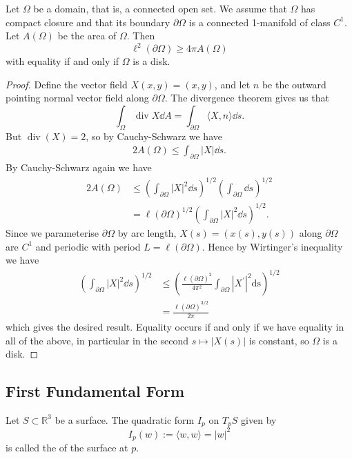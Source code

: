 \documentclass[10pt]{article}
\begin{document}
\begin{theorem}
    Let $\Omega$ be a domain, that is, a connected open set. We assume that $\Omega$ has compact closure and that its boundary $\partial \Omega$ is a connected 1-manifold of class $C^1$. Let $A(\Omega)$ be the area of $\Omega$. Then
$$
    \ell^2(\partial \Omega) \geq 4 \pi A(\Omega)
$$
with equality if and only if $\Omega$ is a disk.
\end{theorem}
\begin{proof}
    Define the vector field $X(x, y) = (x, y)$, and let $n$ be the outward pointing normal vector field along $\partial \Omega$. The divergence theorem gives us that
    $$
    \int_{\Omega} \operatorname{div} X \dd A = \int_{\partial \Omega} \langle X, n \rangle \dd s.
    $$
    But $\operatorname{div}(X) = 2$, so by Cauchy-Schwarz we have
    \begin{align*}
        2A(\Omega) \leq \int_{\partial \Omega} |X| \dd s.
    \end{align*}
    By Cauchy-Schwarz again we have
    \begin{align*}
        2A(\Omega) &\leq \left(\int_{\partial \Omega} |X|^2 \dd s \right)^{1/2}
        \left(\int_{\partial \Omega} \dd s\right)^{1/2} \\
&= \ell(\partial \Omega)^{1/2} \left(\int_{\partial \Omega} |X|^2 \dd s \right)^{1/2}.
    \end{align*}
Since we parameterise $\partial \Omega$ by arc length, $X(s) = (x(s), y(s))$ along $\partial \Omega$ are $C^1$ and periodic with period $L = \ell(\partial \Omega)$. Hence by Wirtinger's inequality we have
\begin{align*}
    \left(\int_{\partial \Omega} |X|^2 \dd s \right)^{1/2} &\leq \left(\frac{\ell(\partial \Omega)^2}{4 \pi^2} \int_{\partial \Omega}\left|X^{\prime}\right|^2 \mathrm{ds}\right)^{1 / 2}\\
    &=\frac{\ell(\partial \Omega)^{3 / 2}}{2 \pi}  
\end{align*}
which gives the desired result. Equality occurs if and only if we have equality in all of the above, in particular in the second $s \mapsto |X(s)|$ is constant, so $\Omega$ is a disk.
\end{proof}

  
\subsection{First Fundamental Form}

\begin{definition}
Let $S \subset \mathbb{R}^3$ be a surface. The quadratic form $I_p$ on $T_p S$ given by
$$
I_p(w):=\langle w, w\rangle=|w|^2
$$
is called the  of the surface at $p$.
\end{definition}
\end{document}
